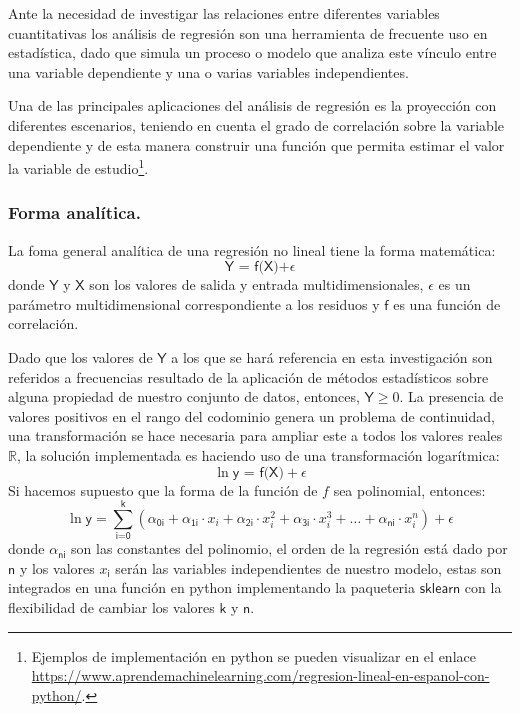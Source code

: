 Ante la necesidad de investigar las relaciones entre diferentes variables cuantitativas los análisis de regresión son una herramienta de frecuente uso en estadística, dado que simula un proceso o modelo que analiza este vínculo entre una variable dependiente y una o varias variables independientes. 

Una de las principales aplicaciones del análisis de regresión es la proyección con diferentes escenarios, teniendo en cuenta el grado de correlación sobre la variable dependiente y de esta manera construir una función que permita estimar el valor la variable de estudio\footnote{Ejemplos de implementación en python se pueden visualizar en el enlace \href{https://www.aprendemachinelearning.com/regresion-lineal-en-espanol-con-python/}{https://www.\-apren\-de\-machine\-learning\-.com/\-re\-gre\-si\-on-\-li\-neal-en-\-es\-pa\-nol-\-con-\-py\-thon/}.}. 

\subsubsection{Forma analítica.}
La foma general analítica de una regresión no lineal tiene la forma matemática:
\begin{equation}
\textsf{Y = f(X)+}\epsilon
\end{equation}
donde $\textsf{Y}$ y $\textsf{X}$ son los valores de salida y entrada multidimensionales, $\epsilon$ es un parámetro multidimensional correspondiente a los residuos y $\textsf{f}$ es una función de correlación.

Dado que los valores de $\textsf{Y}$ a los que se hará referencia en esta investigación son referidos a frecuencias resultado de la aplicación de métodos estadísticos sobre alguna propiedad de nuestro conjunto de datos, entonces, $\textsf{Y} \geqslant 0$. La presencia de valores positivos en el rango del codominio genera un problema de continuidad, una transformación se hace necesaria para ampliar este a todos los valores reales $\mathbb{R}$, la solución implementada es haciendo uso de una transformación logarítmica:
\begin{equation}
\ln \textsf{y = f(X)}+\epsilon
\end{equation}
Si hacemos supuesto que la forma de la función de $f$ sea polinomial, entonces:
\begin{equation}\label{regresion}
\ln \textsf{y} = \sum_\textsf{i=0}^\textsf{k} (\alpha_\textsf{0i} + \alpha_\textsf{1i}\cdot x_i + \alpha_\textsf{2i}\cdot x_i^2 + \alpha_\textsf{3i}\cdot x_i^3 + \ldots+\alpha_\textsf{ni} \cdot x_i^n)+\epsilon
\end{equation}
donde $\alpha_\textsf{ni}$ son las constantes del polinomio, el orden de la regresión está dado por $\textsf{n}$ y los valores $x_\textsf{i}$ serán las variables independientes de nuestro modelo, estas son integrados en una función en python implementando la paqueteria $\textsf{sklearn}$ con la flexibilidad de cambiar los valores $\textsf{k}$ y $\textsf{n}$. %


